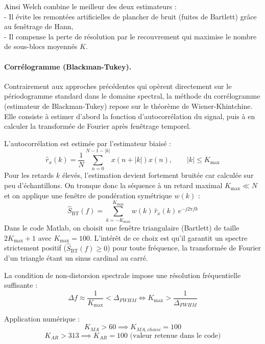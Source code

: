 \documentclass[11pt,a4paper]{article}
\begin{document}
Ainsi Welch combine le meilleur des deux estimateurs :
\\- Il évite les remontées artificielles de plancher de bruit (fuites de Bartlett) grâce au fenêtrage de Hann,
\\- Il compense la perte de résolution par le recouvrement qui maximise le nombre de sous-blocs moyennés $K$.

\paragraph{Corrélogramme (Blackman-Tukey).} Contrairement aux approches précédentes qui opèrent directement sur le périodogramme standard dans le domaine spectral, la méthode du corrélogramme (estimateur de Blackman-Tukey) repose sur le théorème de Wiener-Khintchine. Elle consiste à estimer d'abord la fonction d'autocorrélation du signal, puis à en calculer la transformée de Fourier après fenêtrage temporel.

L'autocorrélation est estimée par l'estimateur biaisé :
\begin{equation}
    \hat{r}_x(k) = \frac{1}{N} \sum_{n=0}^{N-1-|k|} x(n+|k|) x(n), \qquad |k| \leq K_{\max}
\end{equation}
Pour les retards $k$ élevés, l'estimation devient fortement bruitée car calculée sur peu d'échantillons. On tronque donc la séquence à un retard maximal $K_{\max} \ll N$ et on applique une fenêtre de pondération symétrique $w(k)$ :
\begin{equation}
    \hat{S}_{\text{BT}}(f) = \sum_{k=-K_{\max}}^{K_{\max}} w(k)\, \hat{r}_x(k)\, e^{-j 2 \pi f k}
\end{equation}
Dans le code Matlab, on choisit une fenêtre triangulaire (Bartlett) de taille $2 K_{\max} + 1$ avec $K_{\max} = 100$. L'intérêt de ce choix est qu'il garantit un spectre strictement positif ($\hat{S}_{\text{BT}}(f) \geq 0$) pour toute fréquence, la transformée de Fourier d'un triangle étant un sinus cardinal au carré.

La condition de non-distorsion spectrale impose une résolution fréquentielle suffisante :
\begin{equation}
    \Delta f \approx \frac{1}{K_{\max}} < \Delta_{FWHM} \iff K_{\max} > \frac{1}{\Delta_{FWHM}}
\end{equation}

Application numérique :
$$K_{MA} > 60 \implies K_{MA, choisi} = 100$$
$$K_{AR} > 313 \implies K_{AR} = 100 \text{ (valeur retenue dans le code)}$$
\end{document}
